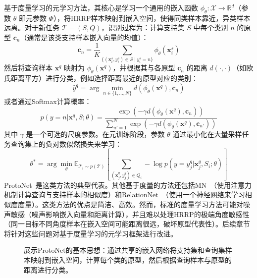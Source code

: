 基于度量学习的元学习方法，其核心是学习一个通用的嵌入函数 $\phi_\theta: \mathcal{X} \rightarrow \mathbb{R}^d$（参数 $\theta$ 即元参数 $\Phi$），将HRRP样本映射到嵌入空间，使得同类样本靠近，异类样本远离。对于新任务 $\mathcal{T}=(S, Q)$，识别过程为：计算支持集 $S$ 中每个类别 $n$ 的原型 $\mathbf{c}_n$（通常是该类支持样本嵌入向量的均值）：
\begin{equation}
    \mathbf{c}_n = \frac{1}{K} \sum_{\{(\mathbf{x}_i^s, y_i^s) \in S \mid y_i^s=n\}} \phi_\theta(\mathbf{x}_i^s)
    \label{eq:prototype_calculation}
\end{equation}
然后将查询样本 $\mathbf{x}^q$ 映射为 $\phi_\theta(\mathbf{x}^q)$，并根据其与各原型 $\mathbf{c}_n$ 的距离 $d(\cdot, \cdot)$（如欧氏距离平方）进行分类，例如选择距离最近的原型对应的类别：
\begin{equation}
    \hat{y}^q = \arg\min_{n \in \{1, \dots, N\}} d(\phi_\theta(\mathbf{x}^q), \mathbf{c}_n)
    \label{eq:protonet_prediction_argmin}
\end{equation}
或者通过Softmax计算概率：
\begin{equation}
    p(y=n | \mathbf{x}^q, S; \theta) = \frac{\exp(-\gamma d(\phi_\theta(\mathbf{x}^q), \mathbf{c}_n))}{\sum_{n'=1}^{N} \exp(-\gamma d(\phi_\theta(\mathbf{x}^q), \mathbf{c}_{n'}))}
    \label{eq:protonet_prediction_softmax_gamma} %
\end{equation}
其中 $\gamma$ 是一个可选的尺度参数。在元训练阶段，参数 $\theta$ 通过最小化在大量采样任务查询集上的负对数似然损失来学习：
\begin{equation}
    \theta^* = \arg\min_{\theta} \mathbb{E}_{\mathcal{T}_i \sim p(\mathcal{T})} \left[ \sum_{(\mathbf{x}_j^q, y_j^q) \in Q_i} -\log p(y=y_j^q | \mathbf{x}_j^q, S_i; \theta) \right]
    \label{eq:protonet_meta_objective}
\end{equation}
ProtoNet~\cite{X}是这类方法的典型代表。其他基于度量的方法还包括MN~\cite{X}（使用注意力机制计算查询与支持样本的相似度）和RelationNet~\cite{X}（使用一个神经网络来学习相似度度量）。这类方法的优点是简洁、高效。然而，标准的度量学习方法可能对噪声敏感（噪声影响嵌入向量和距离计算），并且难以处理HRRP的极端角度敏感性（同一目标不同角度样本在嵌入空间可能距离很远，破坏原型代表性）。后续章节将针对这些问题对基于度量学习的元学习框架进行改进。

\begin{figure}[h!]
    \centering
    \caption{展示ProtoNet的基本思想：通过共享的嵌入网络将支持集和查询集样本映射到嵌入空间，计算每个类的原型，然后根据查询样本与原型的距离进行分类。}
    \label{fig:protonet}
\end{figure}

